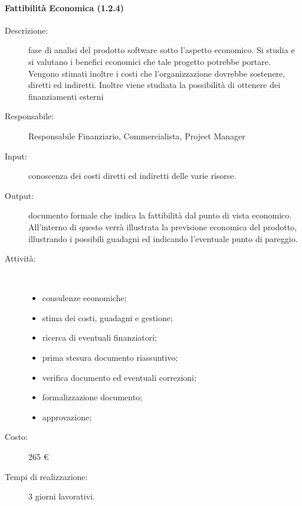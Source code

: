 \paragraph{Fattibilit\`{a} Economica (1.2.4)}
\begin{description}
\item[Descrizione:] fase di analisi del prodotto software sotto l'aspetto economico. Si studia e si valutano i benefici economici che tale progetto potrebbe portare. Vengono stimati inoltre i costi che l'organizzazione dovrebbe sostenere, diretti ed indiretti. Inoltre viene studiata la possibilit\`{a} di ottenere dei finanziamenti esterni 
\item[Responsabile:] Responsabile Finanziario, Commercialista, Project Manager
\item[Input:] conoscenza dei costi diretti ed indiretti delle varie risorse.
\item[Output:] documento formale che indica la fattibilità dal punto di vista economico. All'interno di questo verrà illustrata la previsione economica del prodotto, illustrando i possibili guadagni ed indicando l'eventuale punto di pareggio.
\item[Attività:]\mbox{}\\[-1.5\baselineskip]
	\begin{itemize}
	\item consulenze economiche;
	\item stima dei costi, guadagni e gestione;
	\item ricerca di eventuali finanziatori;
	\item prima stesura documento riassuntivo;
	\item verifica documento ed eventuali correzioni;
	\item formalizzazione documento;
	\item approvazione;
	\end{itemize}
\item[Costo:] 265 \euro{}
\item[Tempi di realizzazione:] 3 giorni lavorativi.
\end{description}


